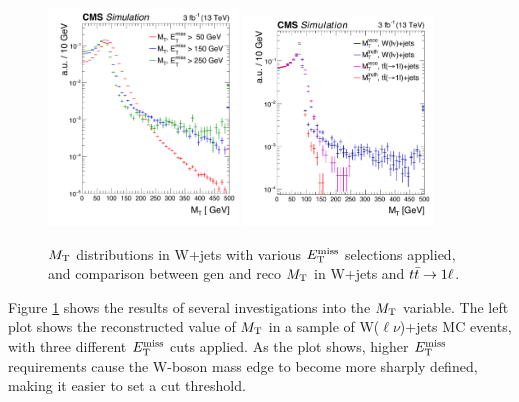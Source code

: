 \begin{figure}[htb]
\centering
\includegraphics[width=0.45\textwidth]{figures/mtstudies_W_reco.pdf}
\includegraphics[width=0.45\textwidth]{figures/mtstudies_WTop_recogen.pdf}
\caption{$M_\text{T}$ distributions in W+jets with various $E_\text{T}^\text{miss}$ selections
  applied, and comparison between gen and reco $M_\text{T}$ in W+jets and
  $t\bar{t} \rightarrow 1\ell$.}
\label{fig:stop:mtstudies}
\end{figure}

Figure \ref{fig:stop:mtstudies} shows the results of several
investigations into the $M_\text{T}$ variable. The left plot shows the
reconstructed value of $M_\text{T}$ in a sample of W($\ell\nu$)+jets MC
events, with three different $E_\text{T}^\text{miss}$ cuts applied. As the plot shows,
higher $E_\text{T}^\text{miss}$ requirements cause the W-boson mass edge to become more
sharply defined, making it easier to set a cut threshold.

